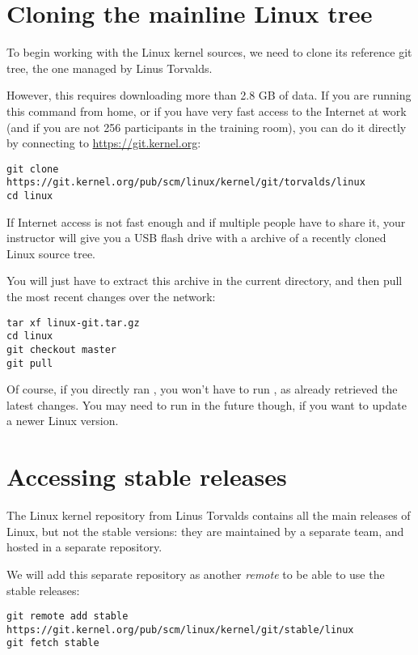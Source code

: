 \section{Cloning the mainline Linux tree}

To begin working with the Linux kernel sources, we need to clone its
reference git tree, the one managed by Linus Torvalds.

However, this requires downloading more than 2.8 GB of data. If you
are running this command from home, or if you have very fast access to
the Internet at work (and if you are not 256 participants in the
training room), you can do it directly by connecting to
\url{https://git.kernel.org}:

\begin{verbatim}
git clone https://git.kernel.org/pub/scm/linux/kernel/git/torvalds/linux
cd linux
\end{verbatim}

If Internet access is not fast enough and if multiple people have to
share it, your instructor will give you a USB flash drive with a
 archive of a recently cloned Linux source tree.

You will just have to extract this archive in the current directory,
and then pull the most recent changes over the network:

\begin{verbatim}
tar xf linux-git.tar.gz
cd linux
git checkout master
git pull
\end{verbatim}

Of course, if you directly ran
, you won't have to run , as
 already retrieved the latest changes. You may need to
run  in the future though, if you want to update a
newer Linux version.

\section{Accessing stable releases}

The Linux kernel repository from Linus Torvalds contains all the main
releases of Linux, but not the stable versions: they are maintained by
a separate team, and hosted in a separate repository.

We will add this separate repository as another {\em remote} to be
able to use the stable releases:

{\small
\begin{verbatim}
git remote add stable https://git.kernel.org/pub/scm/linux/kernel/git/stable/linux
git fetch stable
\end{verbatim}
}

